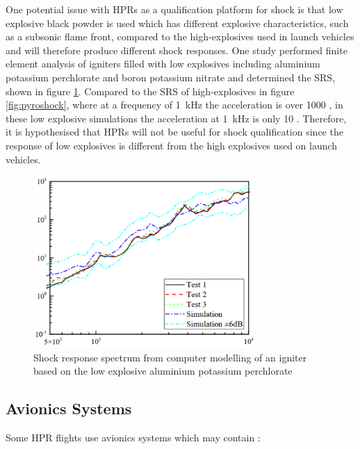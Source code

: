 \documentclass{report}
\begin{document}
One potential issue with HPRs as a qualification platform for shock is that low explosive black powder is used \cite{canepa2005modern} which has different explosive characteristics, such as a subsonic flame front, compared to the high-explosives used in launch vehicles \cite{bement1995manual} and will therefore produce different shock responses. One study \cite{wang2023numerical} performed finite element analysis of igniters filled with low explosives including aluminium potassium perchlorate and boron potassium nitrate and determined the SRS, shown in figure \ref{fig:lowsrs}. Compared to the SRS of high-explosives in figure \ref{fig:pyroshock}, where at a frequency of \SI{1}{\kilo\hertz} the acceleration is over \SI{1000}{\gacc} \cite{nasa-pyroshock}, in these low explosive simulations the acceleration at \SI{1}{\kilo\hertz} is only \SI{10}{\gacc} \cite{wang2023numerical}. Therefore, it is hypothesised that HPRs will not be useful for shock qualification since the response of low explosives is different from the high explosives used on launch vehicles.


\begin{figure}[H]
  \centering
  \includegraphics[width=0.75\textwidth]{images/deflagration.png}
  \caption{Shock response spectrum from computer modelling of an igniter based on the low explosive aluminium potassium perchlorate \cite{wang2023numerical}}
  \label{fig:lowsrs}
\end{figure}

\subsection{Avionics Systems}

Some HPR flights use avionics systems which may contain \cite{canepa2005modern,telaak2023designing}:
\end{document}
